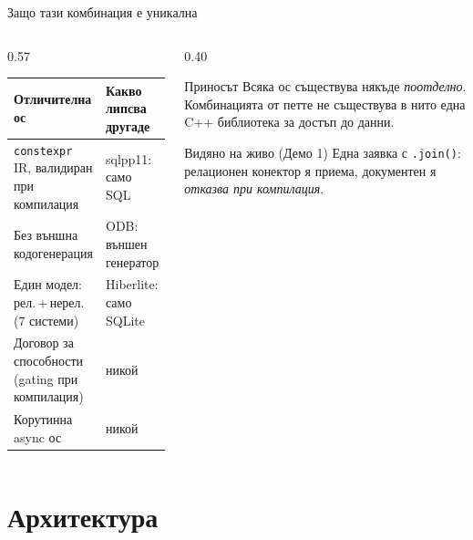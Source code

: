\documentclass[aspectratio=169,12pt]{beamer}
\begin{document}
\begin{frame}{Защо тази комбинация е уникална}
    \begin{columns}[T]
        \begin{column}{0.57\textwidth}
            \footnotesize
            \begin{tabularx}{\linewidth}{@{}p{3.45cm}X@{}}
                \toprule
                \textbf{Отличителна ос} & \textbf{Какво липсва другаде}\\
                \midrule
                \texttt{constexpr} IR, валидиран при компилация & sqlpp11: само SQL\\
                Без външна кодогенерация & ODB: външен генератор\\
                Един модел: рел.\,+\,нерел. (7 системи) & Hiberlite: само SQLite\\
                Договор за способности (gating при компилация) & никой\\
                Корутинна async ос & никой\\
                \bottomrule
            \end{tabularx}
        \end{column}
        \begin{column}{0.40\textwidth}
            \begin{alertblock}{Приносът}
                {\footnotesize Всяка ос съществува някъде \emph{поотделно}.
                Комбинацията от петте не съществува в нито една C++ библиотека за
                достъп до данни.}
            \end{alertblock}
            \begin{block}{Видяно на живо (Демо 1)}
                {\footnotesize Една заявка с \texttt{.join()}: релационен конектор я
                приема, документен я \emph{отказва при компилация}.}
            \end{block}
        \end{column}
    \end{columns}
\end{frame}

\section{Архитектура}
\end{document}
